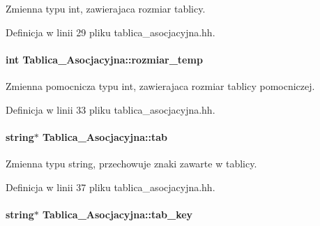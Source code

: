 \-Zmienna typu int, zawierajaca rozmiar tablicy. 



\-Definicja w linii 29 pliku tablica\-\_\-asocjacyjna.\-hh.

\hypertarget{class_tablica___asocjacyjna_afb2be30a2a037038f970ee17ef16cc7d}{
\paragraph[{rozmiar\-\_\-temp}]{\setlength{\rightskip}{0pt plus 5cm}int {\bf \-Tablica\-\_\-\-Asocjacyjna\-::rozmiar\-\_\-temp}}}\label{class_tablica___asocjacyjna_afb2be30a2a037038f970ee17ef16cc7d}


\-Zmienna pomocnicza typu int, zawierajaca rozmiar tablicy pomocniczej. 



\-Definicja w linii 33 pliku tablica\-\_\-asocjacyjna.\-hh.

\hypertarget{class_tablica___asocjacyjna_a8cd88c82018c6b9dd122796a067ba30d}{
\paragraph[{tab}]{\setlength{\rightskip}{0pt plus 5cm}string$\ast$ {\bf \-Tablica\-\_\-\-Asocjacyjna\-::tab}}}\label{class_tablica___asocjacyjna_a8cd88c82018c6b9dd122796a067ba30d}


\-Zmienna typu string, przechowuje znaki zawarte w tablicy. 



\-Definicja w linii 37 pliku tablica\-\_\-asocjacyjna.\-hh.

\hypertarget{class_tablica___asocjacyjna_a27041d1c629b781bbeeeafd19498ed05}{
\paragraph[{tab\-\_\-key}]{\setlength{\rightskip}{0pt plus 5cm}string$\ast$ {\bf \-Tablica\-\_\-\-Asocjacyjna\-::tab\-\_\-key}}}\label{class_tablica___asocjacyjna_a27041d1c629b781bbeeeafd19498ed05}


